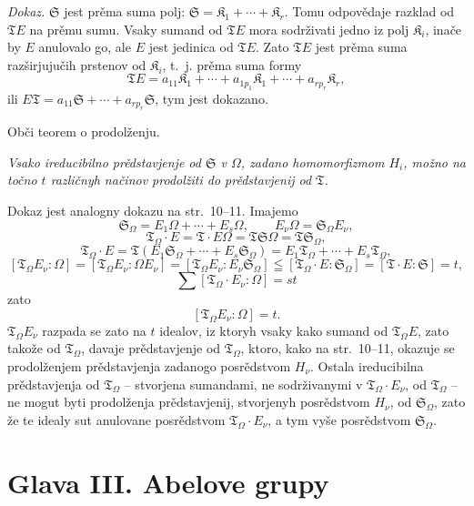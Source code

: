 \documentclass[11pt]{article}
\begin{document}
\emph{Dokaz.} \(\mathfrak S\) jest prěma suma polj: \(\mathfrak S=\mathfrak K_1+\cdots+\mathfrak K_r\). Tomu odpovědaje razklad od \(\mathfrak T E\) na prěmu sumu. Vsaky sumand od \(\mathfrak T E\) mora sodrživati jedno iz polj \(\mathfrak K_i\), inače by \(E\) anulovalo go, ale \(E\) jest jedinica od \(\mathfrak T E\). Zato \(\mathfrak T E\) jest prěma suma razširjujučih prstenov od \(\mathfrak K_i\), t.~j. prěma suma formy
\[
\mathfrak T E=a_{11}\mathfrak K_1+\cdots+a_{1p_1}\mathfrak K_1+\cdots+a_{rp_r}\mathfrak K_r,
\]
ili \(E\mathfrak T=a_{11}\mathfrak S+\cdots+a_{rp_r}\mathfrak S\), tym jest dokazano.

\begin{center}
Obči teorem o prodolženju.
\end{center}

\emph{Vsako ireducibilno prědstavjenje od \(\mathfrak S\) v \(\Omega\), zadano homomorfizmom \(H_i\), možno na točno \(t\) različnyh načinov prodolžiti do prědstavjenij od \(\mathfrak T\).}

Dokaz jest analogny dokazu na str.~10--11. Imajemo
\[
\mathfrak S_\Omega=E_1\Omega+\cdots+E_s\Omega,\qquad
E_\nu\Omega=\mathfrak S_\Omega E_\nu,
\]
\[
\mathfrak T_\Omega\cdot E=\mathfrak T\cdot E\Omega
=\mathfrak T\mathfrak S\Omega=\mathfrak T\mathfrak S_\Omega,
\]
\[
\mathfrak T_\Omega\cdot E
=\mathfrak T(E_1\mathfrak S_\Omega+\cdots+E_s\mathfrak S_\Omega)
=E_1\mathfrak T_\Omega+\cdots+E_s\mathfrak T_\Omega,
\]
\[
[\mathfrak T_\Omega E_\nu:\Omega]
=[\mathfrak T_\Omega E_\nu:\Omega E_\nu]
=[\mathfrak T_\Omega E_\nu:E_\nu\mathfrak S_\Omega]
\leqq[\mathfrak T_\Omega\cdot E:\mathfrak S_\Omega]
=[\mathfrak T\cdot E:\mathfrak S]=t,
\]
\[
\sum[\mathfrak T_\Omega\cdot E_\nu:\Omega]=st
\]
zato
\[
[\mathfrak T_\Omega E_\nu:\Omega]=t.
\]
\(\mathfrak T_\Omega E_\nu\) razpada se zato na \(t\) idealov, iz ktoryh vsaky kako sumand od \(\mathfrak T_\Omega E\), zato takože od \(\mathfrak T_\Omega\), davaje prědstavjenje od \(\mathfrak T_\Omega\), ktoro, kako na str.~10--11, okazuje se prodolženjem prědstavjenja zadanogo posrědstvom \(H_\nu\). Ostala ireducibilna prědstavjenja od \(\mathfrak T_\Omega\) -- stvorjena sumandami, ne sodrživanymi v \(\mathfrak T_\Omega\cdot E_\nu\), od \(\mathfrak T_\Omega\) -- ne mogut byti prodolženja prědstavjenij, stvorjenyh posrědstvom \(H_\nu\), od \(\mathfrak S_\Omega\), zato že te idealy sut anulovane posrědstvom \(\mathfrak T_\Omega\cdot E_\nu\), a tym vyše posrědstvom \(\mathfrak S_\Omega\).

\section*{Glava III. Abelove grupy}\label{kapitel-iii.-abelsche-gruppen}
\end{document}
